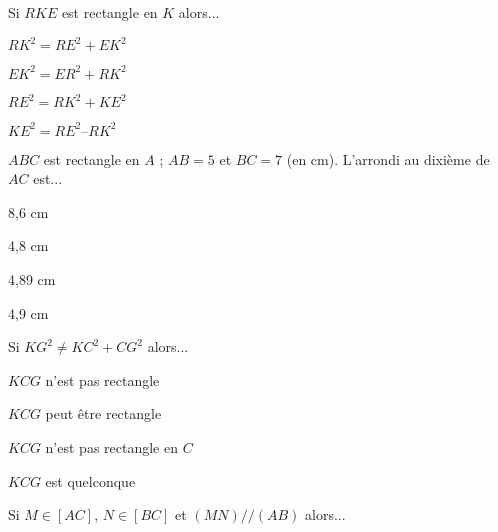 



\begin{QCM}

\begin{GroupeQCM}

\begin{exercice}Si $RKE$ est rectangle en $K$ alors...
\begin{ChoixQCM}{4}
\item $RK^2 = RE^2 + EK^2$
\item $EK^2 = ER^2 + RK^2$
\item $RE^2 = RK^2 + KE^2$
\item $KE^2 = RE^2 – RK^2$
\end{ChoixQCM}
\begin{corrige}
\end{corrige}
\end{exercice}

\begin{exercice}$ABC$ est rectangle en $A$ ; $AB = 5$ et $BC = 7$ (en cm). L'arrondi au dixième de $AC$ est...
\begin{ChoixQCM}{4}
\item 8,6 cm
\item 4,8 cm
\item 4,89 cm
\item 4,9 cm
\end{ChoixQCM}
\begin{corrige}
\end{corrige}
\end{exercice}

\begin{exercice}Si $KG^2 \neq KC^2 + CG^2$ alors...
\begin{ChoixQCM}{4}
\item $KCG$ n'est pas rectangle
\item $KCG$ peut être rectangle
\item $KCG$ n'est pas rectangle en $C$
\item $KCG$ est quelconque
\end{ChoixQCM}
\begin{corrige}
\end{corrige}
\end{exercice}

\begin{exercice}Si $M\in [AC]$, $N\in [BC]$ et $(MN)//(AB)$ alors...


\end{exercice}
\end{GroupeQCM}
\end{QCM}
